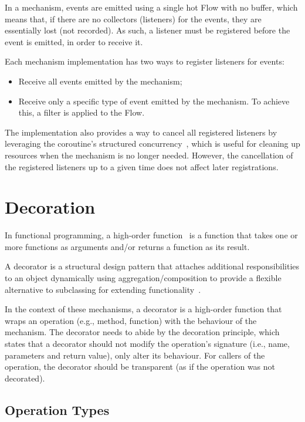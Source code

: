 In a mechanism, events are emitted using a single hot Flow with no buffer, which means that, if there are no collectors (listeners) for the events, they are essentially lost (not recorded).
As such, a listener must be registered before the event is emitted, in order to receive it.

Each mechanism implementation has two ways to register listeners for events:

\begin{itemize}
    \item Receive all events emitted by the mechanism;
    \item Receive only a specific type of event emitted by the mechanism.
    To achieve this, a filter is applied to the Flow.
\end{itemize}

The implementation also provides a way to cancel all registered listeners by leveraging the coroutine's structured concurrency~\cite{kotlin-coroutines}, which is useful for cleaning up resources when the mechanism is no longer needed.
However, the cancellation of the registered listeners up to a given time does not affect later registrations.


\section{Decoration}\label{sec:decoration}

In functional programming, a high-order function~\cite{higher-order-functions} is a function
that takes one or more functions as arguments and/or returns a function as its result.

A decorator is a structural design pattern
that attaches additional responsibilities to an object dynamically using aggregation/composition to provide a flexible alternative to subclassing for extending functionality~\cite{design-patterns}.

In the context of these mechanisms,
a decorator is a high-order function that wraps an operation
(e.g., method, function) with the behaviour of the mechanism.
The decorator needs to abide by the decoration principle,
which states that a decorator should not modify the operation's signature (i.e., name, parameters and return value), only alter its behaviour.
For callers of the operation, the decorator should be transparent (as if the operation was not decorated).

\subsection{Operation Types}\label{subsec:operation-types}

